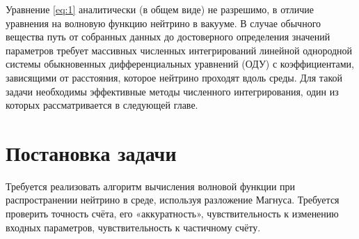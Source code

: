 \documentclass[12pt]{article}
\begin{document}
Уравнение \eqref{eq:1} аналитически (в общем виде) не разрешимо, в отличие уравнения на волновую функцию нейтрино в вакууме. В случае обычного вещества путь от собранных данных до достоверного определения значений параметров требует массивных численных интегрирований линейной однородной системы обыкновенных дифференциальных уравнений (ОДУ) с коэффициентами, зависящими от расстояния, которое нейтрино проходят вдоль среды. Для такой задачи необходимы эффективные методы численного интегрирования, один из которых рассматривается в следующей главе.


\newpage 

\section{Постановка задачи}

Требуется реализовать алгоритм вычисления волновой функции при распространении
нейтрино в среде, используя разложение Магнуса. 
Требуется проверить точность
счёта, его «аккуратность», чувствительность к изменению входных параметров,
чувствительность к частичному счёту.
\end{document}
